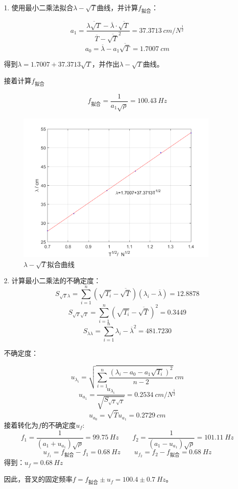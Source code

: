 \documentclass{article}
\begin{document}
1. 使用最小二乘法拟合$\lambda-\sqrt{T}$曲线，并计算$f_{拟合}$：

$$
a_1=\frac{\overline{\lambda\sqrt{T}}-\overline{\lambda}\cdot\overline{\sqrt{T}}}{\overline{T}-\overline{\sqrt{T}}^2}=37.3713\ cm/N^{\frac{1}{2}}
$$
$$
a_0=\overline{\lambda}-a_1\overline{\sqrt{T}}=1.7007\ cm
$$

得到$\lambda=1.7007+37.3713\sqrt{T}$，并作出$\lambda-\sqrt{T}$曲线。

接着计算$f_{拟合}$

$$
f_{拟合}=\frac{1}{a_1\sqrt{\rho}}=100.43\ Hz
$$

\begin{figure}[!ht]
    \centering
    \includegraphics[width=10cm]{4.png}
    \caption{$\lambda-\sqrt{T}拟合曲线$}
\end{figure}

2. 计算最小二乘法的不确定度：
$$
S_{\sqrt{T}\lambda}=\sum_{i=1}^{n}(\sqrt{T_i}-\overline{\sqrt{T}})(\lambda_i-\overline{\lambda})=12.8878
$$
$$
S_{\sqrt{T}\sqrt{T}}=\sum_{i=1}^{n}(\sqrt{T_i}-\overline{\sqrt{T}})^2=0.3449
$$
$$
S_{\lambda\lambda}=\sum_{i=1}^{n}{\lambda_i-\overline{\lambda}}^2=481.7230
$$

不确定度：

$$
u_{\lambda_i}=\sqrt{\sum_{i=1}^{n}\frac{(\lambda_i-a_0-a_1\sqrt{T_i})^2}{n-2}}\ cm
$$
$$
u_{a_1}=\frac{u_{\lambda_i}}{\sqrt{S_{\sqrt{T}\sqrt{T}}}}=0.2534\ cm/N^{\frac{1}{2}}
$$
$$
u_{a_0}=\sqrt{\overline{T}}u_{a_1}=0.2729\ cm
$$
接着转化为$f$的不确定度$u_f$:
$$
f_1=\frac{1}{(a_1+u_{a_1})\sqrt{\rho}}=99.75\ Hz \qquad f_2=\frac{1}{(a_1-u_{a_1})\sqrt{\rho}}=101.11\ Hz
$$
$$
u_{f_1}=f_{拟合}-f_1=0.68\ Hz \qquad u_{f_2}=f_2-f_{拟合}=0.68\ Hz
$$
得到：$u_{f}=0.68\ Hz$

因此，音叉的固定频率$f=f_{拟合}\pm u_f=100.4\pm 0.7\ Hz$。
\end{document}
